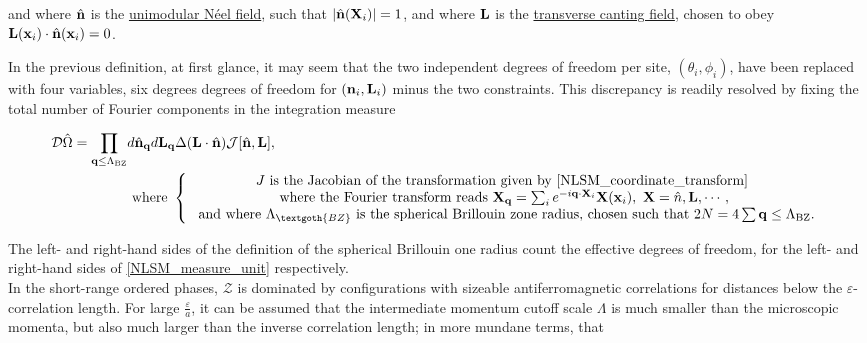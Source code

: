 and where $\hat{{\bf n}}$ is the \underline{unimodular Néel field}, such that $|\hat{{\bf n}}({\bf X}_i)| =1$, and where ${\bf L}$ is the \underline{transverse canting field}, chosen to obey ${\bf L}({\bf x}_i) \cdot \hat{{\bf n}}({\bf x}_i) = 0$. 

In the previous definition, at first glance, it may seem that the two independent degrees of freedom per site, $(\theta_i, \phi_i)$, have been replaced with four variables, six degrees degrees of freedom for $({\bf n}_i , {\bf L}_i)$
minus the two constraints. This discrepancy is readily resolved by fixing the total number of Fourier components in the integration measure

\begin{equation}
\begin{split}
    \mathcal{D} \hat{\Omega} = \prod_{{\bf q} \leq \Lambda_{\textnormal{BZ}}} &d\hat{\bf n}_{{\bf q}} d{\bf L}_{{\bf q}} \Delta({\bf L} \cdot \hat{\bf n}) \mathcal{J}[\hat{\bf n}, {\bf L}], \\
    &\textnormal{ where } \left\{ \begin{array}{cc}
             \textnormal{$J$ is the Jacobian of the transformation given by \cref{NLSM_coordinate_transform} } \\ 
             \textnormal{where the Fourier transform reads } 
             {\bf X}_{{\bf q}} = \sum_{i} e^{-i {\bf q}\cdot{\bf X}_i} {\bf X}({\bf x}_i), \blanky {\bf X} = \hat{n}, {\bf L}, \cdots, \\
             \textnormal{ and where $\Lambda_{\textgoth{BZ}}$ is the spherical Brillouin zone radius, chosen such that } 
             2N = 4 \sum{{\bf q} \leq \Lambda_{\textnormal{BZ}}}.
    \end{array}\right.
    \label{NLSM_measure_unit}
\end{split}
\end{equation}

The left- and right-hand sides of the definition of the spherical Brillouin one radius count the effective degrees of freedom, for the left- and right-hand sides of \cref{NLSM_measure_unit} respectively. \\

In the short-range ordered phases, $\mathcal{Z}$ is dominated by configurations with sizeable antiferromagnetic correlations for distances below the $\varepsilon$-correlation length. For large $\frac{\varepsilon}{a}$, it can be assumed that the intermediate momentum cutoff scale $\Lambda$ is much smaller than the microscopic momenta, but also much larger than the inverse correlation length; in more mundane terms, that

